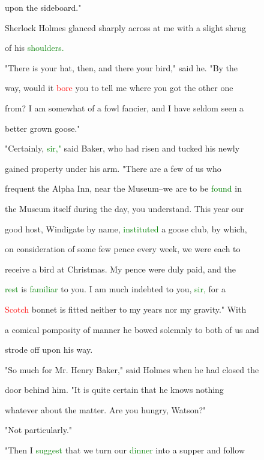  upon the sideboard."



 Sherlock Holmes glanced sharply across at me with a slight shrug

 of his \textcolor{green}{shoulders.}



 "There is your hat, then, and there your bird," said he. "By the

 way, would it \textcolor{red}{bore} you to tell me where you got the other one

 from? I am somewhat of a fowl fancier, and I have seldom seen a

 better grown goose."



 "Certainly, \textcolor{green}{sir,"} said Baker, who had risen and tucked his newly

 \textcolor{BurntOrange}{gained} property under his arm. "There are a few of us who

 frequent the Alpha Inn, near the Museum--we are to be \textcolor{green}{found} in

 the Museum itself during the day, you understand. This year our

 \textcolor{BurntOrange}{good} host, Windigate by name, \textcolor{green}{instituted} a goose club, by which,

 on consideration of some few pence every week, we were each to

 receive a bird at Christmas. My pence were duly paid, and the

 \textcolor{green}{rest} is \textcolor{green}{familiar} to you. I am much indebted to you, \textcolor{green}{sir,} for a

 \textcolor{red}{Scotch} bonnet is fitted neither to my years nor my gravity." With

 a comical pomposity of manner he bowed solemnly to both of us and

 strode off upon his way.



 "So much for Mr. Henry Baker," said Holmes when he had closed the

 door behind him. "It is quite certain that he knows nothing

 whatever about the matter. Are you \textcolor{BurntOrange}{hungry,} Watson?"



 "Not particularly."



 "Then I \textcolor{green}{suggest} that we turn our \textcolor{green}{dinner} into a supper and follow

